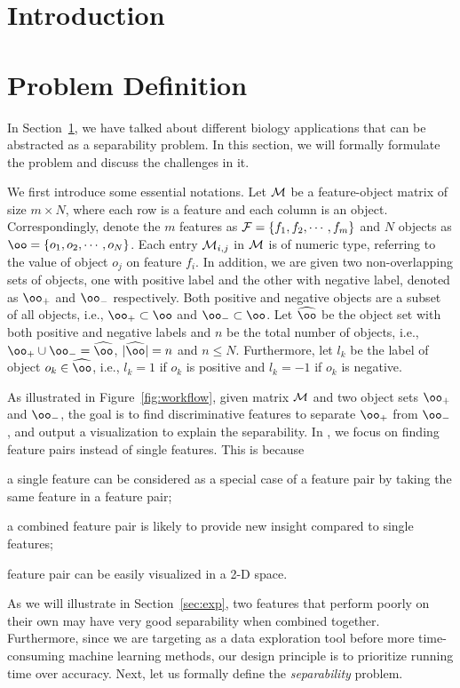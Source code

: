 

\section{Introduction}
\label{sec:intro}





\section{Problem Definition}\label{sec:prob}
In Section~\ref{sec:intro}, we have talked about different biology applications that can be abstracted as a separability problem. In this section, we will formally formulate the problem and discuss the challenges in it. 

We first introduce some essential notations. Let $\mm$ be a feature-object matrix of size $m\times N$, where each row is a feature and each column is an object. Correspondingly, denote the $m$ features as $\ff=\{f_1,f_2,\cdots,f_m\}$ and $N$ objects as $\oo=\{o_1,o_2,\cdots,o_N\}$. Each entry $\mm_{i,j}$ in $\mm$ is of numeric type, referring to the value of object $o_j$ on feature $f_i$. In addition, we are given two non-overlapping sets of objects, one with positive label and the other with negative label, denoted as $\oo_+$ and $\oo_-$ respectively. Both positive and negative objects are a subset of all objects, i.e., $\oo_+\subset \oo$ and $\oo_-\subset \oo$. Let $\widehat{\oo}$ be the object set with both positive and negative labels and $n$ be the total number of objects, i.e., $\oo_+\cup \oo_- = \widehat{\oo}$, $|\widehat{\oo}| = n$ and $n\leq N$. Furthermore, let $l_k$ be the label of object $o_k\in \widehat{\oo}$, i.e., $l_k=1$ if $o_k$ is positive and $l_k=-1$ if $o_k$ is negative. 

As illustrated in Figure~\ref{fig:workflow}, given matrix $\mm$ and two object sets $\oo_+$ and $\oo_-$, the goal is to find discriminative features to separate $\oo_+$ from $\oo_-$, and output a visualization to explain the separability. In \genviz, we focus on finding \topk feature pairs instead of \topk single features. This is because \begin{inparaenum}
\item a single feature can be considered as a special case of a feature pair by taking the same feature in a feature pair;
\item a combined feature pair is likely to provide new insight compared to single features;
\item feature pair can be easily visualized in a 2-D space.
\end{inparaenum}
As we will illustrate in Section~\ref{sec:exp}, two features that perform poorly on their own may have very good separability when combined together. Furthermore, since we are targeting as a data exploration tool before more time-consuming machine learning methods, our design principle is to prioritize running time over accuracy. Next, let us formally define the \textit{separability} problem. 

